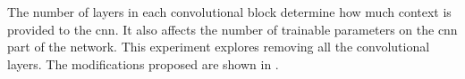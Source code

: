 
The number of layers in each convolutional block determine
how much context is provided to the \gls{cnn}. It also
affects the number of trainable parameters on the \gls{cnn}
part of the network. This experiment explores removing all
the convolutional layers. The modifications proposed are shown in
.

